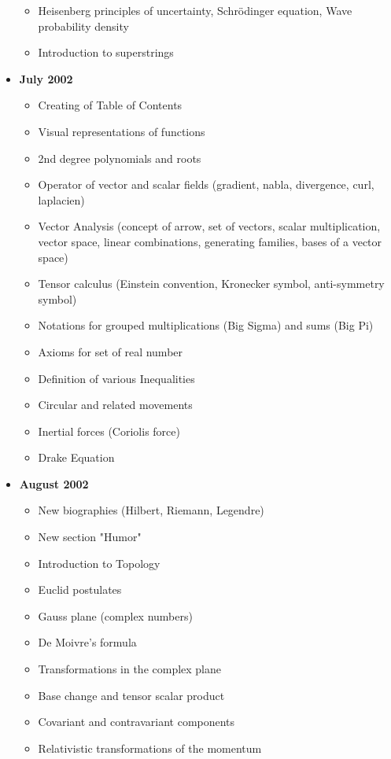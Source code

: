 \documentclass[12pt,a4paper,twoside,openright]{report}
\theoremstyle{definition}
\theoremstyle{itexmp}
\numberwithin{equation}{section}
\begin{document}
\begin{itemize}
\begin{itemize}[noitemsep]
				\item Heisenberg principles of uncertainty, Schrödinger equation, Wave probability density
				\item Introduction to superstrings
			\end{itemize}
		\item \textbf{July 2002}
			\begin{itemize}[noitemsep]
				\item Creating of Table of Contents
				\item Visual representations of functions
				\item 2nd degree polynomials and roots
				\item Operator of vector and scalar fields (gradient, nabla, divergence, curl, laplacien)
				\item Vector Analysis (concept of arrow, set of vectors, scalar multiplication, vector space, linear combinations, generating families, bases of a vector space)
				\item Tensor calculus (Einstein convention, Kronecker symbol, anti-symmetry symbol)
				\item Notations for grouped multiplications (Big Sigma) and sums (Big Pi)
				\item Axioms for set of real number 
				\item Definition of various Inequalities 
				\item Circular and related movements
				\item Inertial forces (Coriolis force)
				\item Drake Equation
			\end{itemize}
		\item \textbf{August 2002}
			\begin{itemize}[noitemsep]
				\item New biographies (Hilbert, Riemann, Legendre)
				\item New section "Humor"
				\item Introduction to Topology
				\item Euclid postulates
				\item Gauss plane (complex numbers)
				\item De Moivre's formula
				\item Transformations in the complex plane
				\item Base change and tensor scalar product
				\item Covariant and contravariant components
				\item Relativistic transformations of the momentum

\end{itemize}
\end{itemize}
\end{document}
